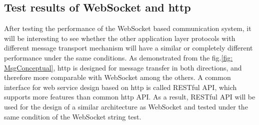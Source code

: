 \subsection{Test results of WebSocket and \gls{http}} \label{chap: Result-RestFUL_WS}
After testing the performance of the WebSocket based communication system, 
it will be interesting to see whether the other application layer protocols with 
different message transport mechanism will have a similar or completely different 
performance under the same conditions. As demonstrated from the 
fig.\ref{fig: MsgConceptual}, \gls{http} is designed for message 
transfer in both directions, and therefore more comparable with WebSocket among the others. 
A common interface for web service design based on \gls{http} is called RESTful API, 
which supports more features than common \gls{http} API. As a result, RESTful API will 
be used for the design of a similar architecture as WebSocket and 
tested under the same condition of the WebSocket string test.


